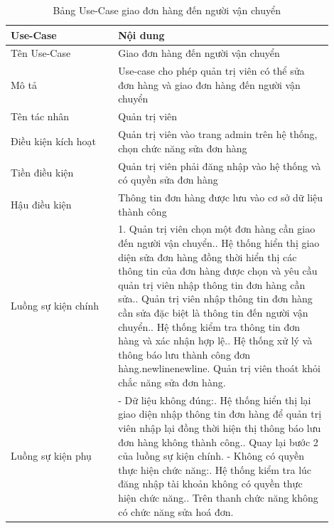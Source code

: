 \begin{longtable}[htp]{ |m{0.3\linewidth}|m{0.6\linewidth}|}
 \caption{Bảng Use-Case giao đơn hàng đến người vận chuyển \label{long}}\\
 \hline
 Use-Case & Nội dung \\
 \hline
 Tên Use-Case & Giao đơn hàng đến người vận chuyển \\
 \hline
 Mô tả & Use-case cho phép quản trị viên có thể sửa đơn hàng và giao đơn hàng đến người vận chuyển\\
 \hline
 Tên tác nhân & Quản trị viên\\
 \hline
 Điều kiện kích hoạt & Quản trị viên vào trang admin trên hệ thống, chọn chức năng sửa đơn hàng\\
 \hline
 Tiền điều kiện & Quản trị viên phải đăng nhập vào hệ thống và có quyền sửa đơn hàng\\
 \hline
 Hậu điều kiện & Thông tin đơn hàng được lưu vào cơ sở dữ liệu thành công\\
 \hline
 Luồng sự kiện chính & 
 1. Quản trị viên chọn một đơn hàng cần giao đến người vận chuyển.\newline
 2. Hệ thống hiển thị giao diện sửa đơn hàng đồng thời hiển thị các thông tin của đơn hàng được chọn và yêu cầu quản trị viên nhập thông tin đơn hàng cần sửa.\newline
 3. Quản trị viên nhập thông tin đơn hàng cần sửa đặc biệt là thông tin đến người vận chuyển.\newline	
 4. Hệ thống kiểm tra thông tin đơn hàng và xác nhận hợp lệ.\newline
 5. Hệ thống xử lý và thông báo lưu thành công đơn hàng.newlinenewline\newline
 6. Quản trị viên thoát khỏi chắc năng sửa đơn hàng.
 \\
 \hline
 Luồng sự kiện phụ & 
 - Dữ liệu không đúng:\newline
  1. Hệ thống hiển thị lại giao diện nhập thông tin đơn hàng để quản trị viên nhập lại đồng thời hiện thị thông báo lưu đơn hàng không thành công.\newline
  2. Quay lại bước 2 của luồng sự kiện chính.\newline
  - Không có quyền thực hiện chức năng:\newline
  1. Hệ thống kiểm tra lúc đăng nhập tài khoản không có quyền thực hiện chức năng.\newline
  2. Trên thanh chức năng không có chức năng sửa hoá đơn.
 \\
 \hline
\end{longtable}
\newpage
